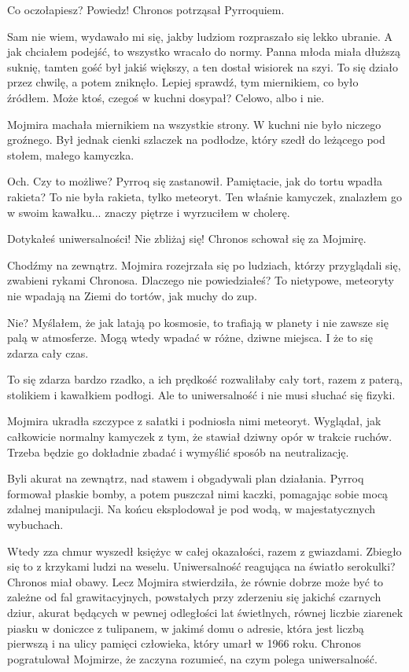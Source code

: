 \ds{} Co oczołapiesz? Powiedz! \dm{} Chronos potrząsał Pyrroquiem. \de{}

\ds{} Sam nie wiem, wydawało mi się, jakby ludziom rozpraszało się lekko ubranie. A jak chciałem podejść, to wszystko wracało do normy.
Panna młoda miała dłuższą suknię, tamten gość był jakiś większy, a ten dostał wisiorek na szyi. To się działo przez chwilę, a potem zniknęło.
Lepiej sprawdź, tym miernikiem, co było źródłem. Może ktoś, czegoś w kuchni dosypał? Celowo, albo i nie. \de{}

Mojmira machała miernikiem na wszystkie strony. W kuchni nie było niczego groźnego. Był jednak cienki szlaczek na podłodze, który szedł do leżącego pod stołem, małego kamyczka.

\ds{} Och. Czy to możliwe? \dm{} Pyrroq się zastanowił. \dm{} Pamiętacie, jak do tortu wpadła rakieta? To nie była rakieta, tylko meteoryt. 
Ten właśnie kamyczek, znalazłem go w swoim kawałku... znaczy piętrze i wyrzuciłem w cholerę. \de{}

\ds{} Dotykałeś uniwersalności! Nie zbliżaj się! \dm{} Chronos schował się za Mojmirę. \de{}

\ds{} Chodźmy na zewnątrz. \dm{} Mojmira rozejrzała się po ludziach, którzy przyglądali się, zwabieni rykami Chronosa. \dm{} 
Dlaczego nie powiedziałeś? To nietypowe, meteoryty nie wpadają na Ziemi do tortów, jak muchy do zup. \de{}

\ds{} Nie? Myślałem, że jak latają po kosmosie, to trafiają w planety i nie zawsze się palą w atmosferze. Mogą wtedy wpadać w różne, dziwne miejsca. 
I że to się zdarza cały czas. \de{}

\ds{} To się zdarza bardzo rzadko, a ich prędkość rozwaliłaby cały tort, razem z paterą, stolikiem i kawałkiem podłogi. Ale to uniwersalność i nie musi słuchać się fizyki. 

Mojmira ukradła szczypce z sałatki i podniosła nimi meteoryt.
Wyglądał, jak całkowicie normalny kamyczek z tym, że stawiał dziwny opór w trakcie ruchów.
Trzeba będzie go dokładnie zbadać i wymyślić sposób na neutralizację.

\divider{}

Byli akurat na zewnątrz, nad stawem i obgadywali plan działania. 
Pyrroq formował płaskie bomby, a potem puszczał nimi kaczki, pomagając sobie mocą zdalnej manipulacji.
Na końcu eksplodował je pod wodą, w majestatycznych wybuchach.

Wtedy zza chmur wyszedł księżyc w całej okazałości, razem z gwiazdami.
Zbiegło się to z krzykami ludzi na weselu. 
Uniwersalność reagująca na światło serokulki? Chronos miał obawy.
Lecz Mojmira stwierdziła, że równie dobrze może być to zależne od fal grawitacyjnych, powstałych przy zderzeniu się jakichś czarnych dziur, akurat będących 
w pewnej odległości lat świetlnych, równej liczbie ziarenek piasku w doniczce z 
tulipanem, w jakimś domu o adresie, która jest liczbą pierwszą i na ulicy pamięci człowieka, który umarł w 1966 roku.
Chronos pogratulował Mojmirze, że zaczyna rozumieć, na czym polega uniwersalność.

